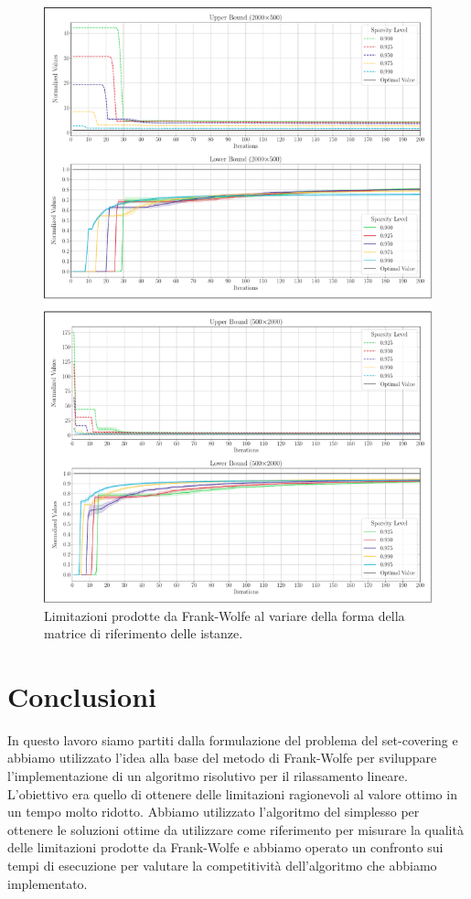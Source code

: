 \begin{figure}[H]
    \centering
    \includegraphics[width=412pt]{assets/figures/conv_shape2.pdf}
    \caption{Limitazioni prodotte da Frank-Wolfe al variare della forma della matrice di riferimento delle istanze.}
    \label{fig:shape_lineplot}
\end{figure}

\section{Conclusioni}
In questo lavoro siamo partiti dalla formulazione del problema del set-covering e abbiamo utilizzato l'idea alla base
del metodo di Frank-Wolfe per sviluppare l'implementazione di un algoritmo risolutivo per il rilassamento lineare.
L'obiettivo era quello di ottenere delle limitazioni ragionevoli al valore ottimo in un tempo molto ridotto. Abbiamo
utilizzato l'algoritmo del simplesso per ottenere le soluzioni ottime da utilizzare come riferimento per misurare la
qualità delle limitazioni prodotte da Frank-Wolfe e abbiamo operato un confronto sui tempi di esecuzione per
valutare la competitività dell'algoritmo che abbiamo implementato.

